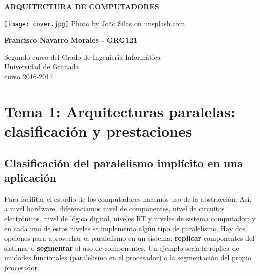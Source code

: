 \documentclass[a4paper, 11pt]{article}
\begin{document}
	
	
	\begin{titlepage}
		\begin{center}
			\vspace*{2cm}
			
			{\Huge \textbf{\textcolor{OliveGreen}{ARQUITECTURA DE COMPUTADORES}}}
			
			
			\vspace{1cm}
			
			
		    \texttt{[image: cover.jpg]}
			{\footnotesize Photo by João Silas on unsplash.com}
			\vspace{2cm}
			
			\textbf{Francisco Navarro Morales - GRG121 }
			
			\vfill
			
			Segundo curso del Grado de Ingeniería Informática\\
			Universidad de Granada\\
			curso 2016-2017\\
			
		\end{center}
	\end{titlepage}



\renewcommand{\abstractname}{Resumen} %



{\parskip=2pt
  \tableofcontents
}


\pagebreak
\section{Tema 1: Arquitecturas paralelas: clasificación y prestaciones}
\subsection{Clasificación del paralelismo implícito en una aplicación}
Para facilitar el estudio de los computadores hacemos uso de la abstracción. Así, a nivel hardware, diferenciamos nivel de componentes, nivel de circuitos electrónicos, nivel de lógica digital, niveles RT y niveles de sistema computador; y en cada uno de estos niveles se implementa algún tipo de paralelismo.
Hay dos opciones para aprovechar el paralelismo en un sistema: \textbf{replicar} componentes del sistema, o \textbf{segmentar} el uso de componentes. Un ejemplo sería la réplica de unidades funcionales (paralelismo en el procesador) o la segmentación del propio procesador.
\end{document}
